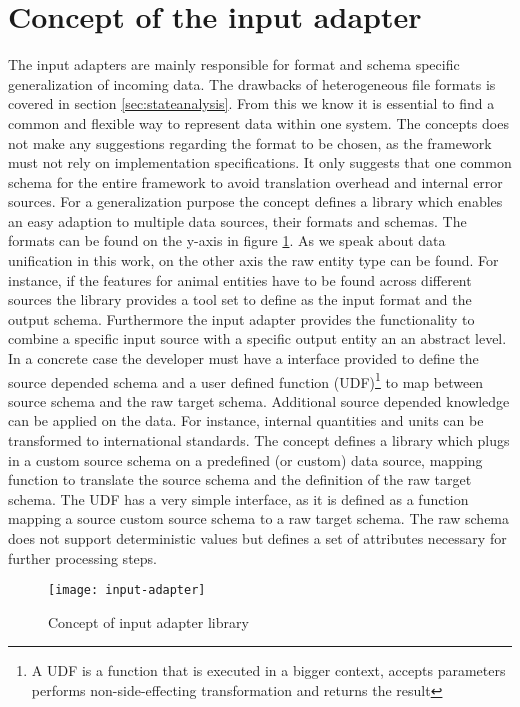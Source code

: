 \section{Concept of the input adapter \label{sec:inputadapter}}

The input adapters are mainly responsible for format and schema specific generalization of incoming data. The drawbacks of heterogeneous file formats is covered in section \ref{sec:stateanalysis}. From this we know it is essential to find a common and flexible way to represent data within one system. The concepts does not make any suggestions regarding the format to be chosen, as the framework must not rely on implementation specifications. It only suggests that one common schema for the entire framework to avoid translation overhead and internal error sources. For a generalization purpose the concept defines a library which enables an easy adaption to multiple data sources, their formats and schemas. The formats can be found on the y-axis in figure \ref{fig:inputadapter}. As we speak about data unification in this work, on the other axis the raw entity type can be found. For instance, if the features for animal entities have to be found across different sources the library provides a tool set to define as the input format and the output schema. Furthermore the input adapter provides the functionality to combine a specific input source with a specific output entity an an abstract level. In a concrete case the developer must have a interface provided to define the source depended schema and a user defined function (UDF)\footnote{A UDF is a function that is executed in a bigger context, accepts parameters performs non-side-effecting transformation and returns the result} to map between source schema and the raw target schema. Additional source depended knowledge can be applied on the data. For instance, internal quantities and units can be transformed to international standards. The concept defines a library which plugs in a custom source schema on a predefined (or custom) data source, mapping function to translate the source schema and the definition of the raw target schema. The UDF has a very simple interface, as it is defined as a function mapping a source custom source schema to a raw target schema. The raw schema does not support deterministic values but defines a set of attributes necessary for further processing steps.

\begin{figure}[htb]
  \centering
  \texttt{[image: input-adapter]}\\
  \caption{Concept of input adapter library}
  \label{fig:inputadapter}
\end{figure}

